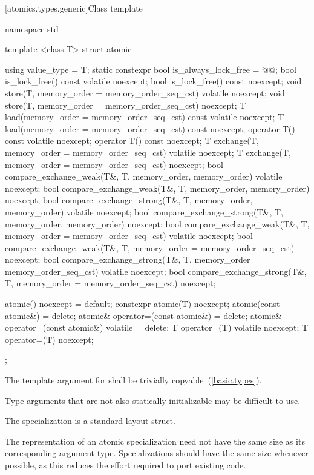 [atomics.types.generic]{Class template }

%
\begin{codeblock}
namespace std {
  template <class T> struct atomic {
    using value_type = T;
    static constexpr bool is_always_lock_free = @@;
    bool is_lock_free() const volatile noexcept;
    bool is_lock_free() const noexcept;
    void store(T, memory_order = memory_order_seq_cst) volatile noexcept;
    void store(T, memory_order = memory_order_seq_cst) noexcept;
    T load(memory_order = memory_order_seq_cst) const volatile noexcept;
    T load(memory_order = memory_order_seq_cst) const noexcept;
    operator T() const volatile noexcept;
    operator T() const noexcept;
    T exchange(T, memory_order = memory_order_seq_cst) volatile noexcept;
    T exchange(T, memory_order = memory_order_seq_cst) noexcept;
    bool compare_exchange_weak(T&, T, memory_order, memory_order) volatile noexcept;
    bool compare_exchange_weak(T&, T, memory_order, memory_order) noexcept;
    bool compare_exchange_strong(T&, T, memory_order, memory_order) volatile noexcept;
    bool compare_exchange_strong(T&, T, memory_order, memory_order) noexcept;
    bool compare_exchange_weak(T&, T, memory_order = memory_order_seq_cst) volatile noexcept;
    bool compare_exchange_weak(T&, T, memory_order = memory_order_seq_cst) noexcept;
    bool compare_exchange_strong(T&, T, memory_order = memory_order_seq_cst) volatile noexcept;
    bool compare_exchange_strong(T&, T, memory_order = memory_order_seq_cst) noexcept;

    atomic() noexcept = default;
    constexpr atomic(T) noexcept;
    atomic(const atomic&) = delete;
    atomic& operator=(const atomic&) = delete;
    atomic& operator=(const atomic&) volatile = delete;
    T operator=(T) volatile noexcept;
    T operator=(T) noexcept;
  };
}
\end{codeblock}

%
\pnum
The template argument for
 shall be trivially copyable~(\ref{basic.types}). \begin{note} Type arguments that are
not also statically initializable may be difficult to use. \end{note}

\pnum
The specialization  is a standard-layout struct.

\pnum
\begin{note} The representation of an atomic specialization need not have the same size as its
corresponding argument type. Specializations should have the same size whenever possible, as
this reduces the effort required to port existing code. \end{note}

